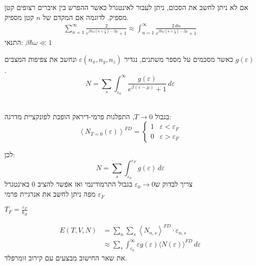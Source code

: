 \begin{cheatformula}
אם לא ניתן לחשב את הסכום, ניתן לעבור לאינטגרל כאשר ההפרש בין איברים רצופים קטן מספיק. לדוגמה אם המקדם של $n$ קטן מספיק.
\begin{align*}
\sum_{n=1}^\infty \frac{2}{e^{\beta \hbar \omega \left(n+\frac{1}{2} \right) - \beta \mu}+1} \approx \int_{n=1}^\infty \frac{2 \, dn}{e^{\beta \hbar \omega \left(n+\frac{1}{2} \right) - \beta \mu}+1}
\end{align*}
התנאי: $\beta \hbar \omega \ll 1$
\end{cheatformula}

\begin{cheatformula}
כאשר מסכמים על מספר משתנים, נגדיר $\varepsilon(n_x,n_y,n_z)$ ונחשב את צפיפות המצבים $g(\varepsilon)$.
$$N = \sum_s \int_{\varepsilon_0}^\infty \frac{g(\varepsilon)}{e^{\beta(\varepsilon - \mu)} + 1} \, d\varepsilon$$
\end{cheatformula}

\begin{cheatformula}\\
בגבול $T \to 0$, התפלגות פרמי-דיראק הופכת לפונקציית מדרגה:
$$\left< N_{T=0}(\varepsilon) \right>^{FD} = \begin{cases}
    1 & \varepsilon < \varepsilon_F \\
    0 & \varepsilon > \varepsilon_F
\end{cases}$$

לכן:
$$N = \sum_s \int_{\varepsilon_0}^{\varepsilon_F} g(\varepsilon) \, d\varepsilon$$
צריך לבדוק ש$\varepsilon_0 \to 0$ בגבול התרמודינמי ואז אפשר להציב 0 באינטגרל \\
מפה ניתן לחשב את אנרגיית פרמי $\varepsilon_F$
\end{cheatformula}

\begin{cheatformula}
$T_F = \frac{\varepsilon_F}{k_B}$
\end{cheatformula}

\begin{cheatformula}
\begin{align*} E \left(T,V,N\right) &= \sum_n \sum_s \left< N_{n,s} \right>^{FD} \cdot \varepsilon_{n,s} \\
    &\approx \sum_s \int_{\varepsilon_0}^{\infty} \varepsilon g\left(\varepsilon\right) \langle N(\varepsilon) \rangle^{FD} \, d\varepsilon
\end{align*}
את שאר החישוב מבצעים עם קירוב זומרפלד.
\end{cheatformula}

